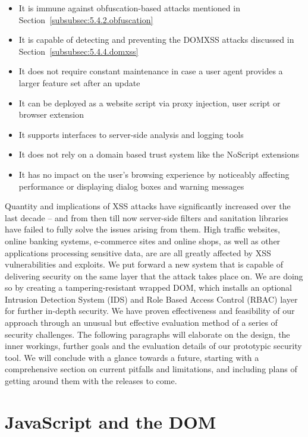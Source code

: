 \begin{itemize}
  \item It is immune against obfuscation-based attacks mentioned in Section~\ref{subsubsec:5.4.2.obfuscation}
  \item It is capable of detecting and preventing the DOMXSS attacks discussed in Section~\ref{subsubsec:5.4.4.domxss}
  \item It does not require constant maintenance in case a user agent provides a larger feature set after an update
  \item It can be deployed as a website script via proxy injection, user script or browser extension
  \item It supports interfaces to server-side analysis and logging tools
  \item It does not rely on a domain based trust system like the NoScript extensions	
  \item It has no impact on the user's browsing experience by noticeably affecting performance or displaying dialog boxes and warning messages
\end{itemize}

  Quantity and implications of XSS attacks have significantly increased over the last decade -- and from then till now server-side filters and sanitation libraries have failed to fully solve the issues arising from them. High traffic websites, online banking systems, e-commerce sites and online shops, as well as other applications processing sensitive data, are are all greatly affected by XSS vulnerabilities and exploits. We put forward a new system that is capable of delivering security on the same layer that the attack takes place on. We are doing so by creating a tampering-resistant wrapped DOM, which installs an optional Intrusion Detection System (IDS) and Role Based Access Control (RBAC) layer for further in-depth security. We have proven effectiveness and feasibility of our approach through an unusual but effective evaluation method of a series of security challenges. The following paragraphs will elaborate on the design, the inner workings, further goals and the evaluation details of our prototypic security tool. We will conclude with a glance towards a future, starting with a comprehensive section on current pitfalls and limitations, and including plans of getting around them with the releases to come.

  \section{JavaScript and the DOM}
  \label{subsec:6.2.javascript_and_the_dom}

